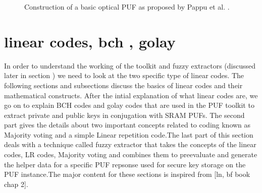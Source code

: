 \begin{figure}
\centering
{}
\caption{Construction of a basic optical PUF as proposed by Pappu et al. \cite{18,19}.}
\label{img:3}
\end{figure}

\section{linear codes, bch , golay}
In order to understand the working of the toolkit and fuzzy extractors (discussed later in section ) we need to look at the two specific type of linear codes. The following sections and subsections discuss the basics of linear codes and their mathematical constructs. After the intial explanation of what linear codes are, we go on to explain BCH codes and golay codes that are used in the PUF toolkit to extract private and public keys in conjugation with SRAM PUFs. The second part
gives the details about two important concepts related to coding known as Majority voting and a simple Linear repetition code.The last part of
this section deals with a technique called fuzzy extractor that takes the concepts of the linear codes, LR codes, Majority voting and combines them to preevaluate and generate the helper data for a specific PUF repsonse used for secure key storage on the PUF instance.The major
content for these sections is inspired from [ln, bf book chap 2].\\

